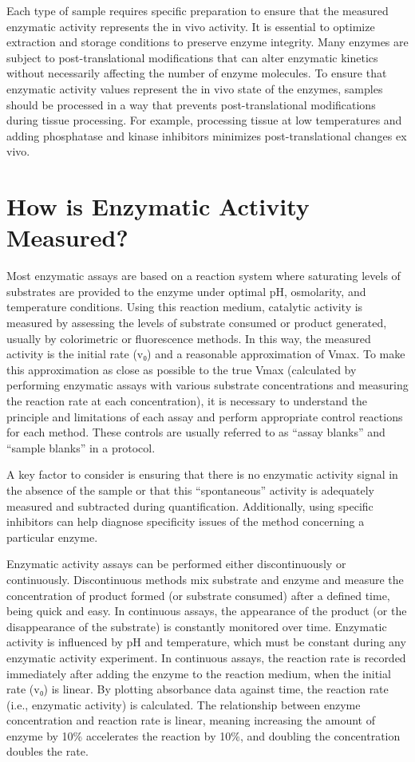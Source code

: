 \documentclass[
  9pt,
  american,
  a5paper,
  extrafontsizes,onecolumn,openright
  ]{memoir}
\newlength{\rf}
\begin{document}
Each type of sample requires specific preparation to ensure that the measured enzymatic activity represents the in vivo activity. It is essential to optimize extraction and storage conditions to preserve enzyme integrity. Many enzymes are subject to post-translational modifications that can alter enzymatic kinetics without necessarily affecting the number of enzyme molecules. To ensure that enzymatic activity values represent the in vivo state of the enzymes, samples should be processed in a way that prevents post-translational modifications during tissue processing. For example, processing tissue at low temperatures and adding phosphatase and kinase inhibitors minimizes post-translational changes ex vivo.

\section{How is Enzymatic Activity Measured?}\label{how-is-enzymatic-activity-measured}

Most enzymatic assays are based on a reaction system where saturating levels of substrates are provided to the enzyme under optimal pH, osmolarity, and temperature conditions. Using this reaction medium, catalytic activity is measured by assessing the levels of substrate consumed or product generated, usually by colorimetric or fluorescence methods. In this way, the measured activity is the initial rate (v₀) and a reasonable approximation of Vmax. To make this approximation as close as possible to the true Vmax (calculated by performing enzymatic assays with various substrate concentrations and measuring the reaction rate at each concentration), it is necessary to understand the principle and limitations of each assay and perform appropriate control reactions for each method. These controls are usually referred to as \enquote{assay blanks} and \enquote{sample blanks} in a protocol.

A key factor to consider is ensuring that there is no enzymatic activity signal in the absence of the sample or that this \enquote{spontaneous} activity is adequately measured and subtracted during quantification. Additionally, using specific inhibitors can help diagnose specificity issues of the method concerning a particular enzyme.

Enzymatic activity assays can be performed either discontinuously or continuously. Discontinuous methods mix substrate and enzyme and measure the concentration of product formed (or substrate consumed) after a defined time, being quick and easy. In continuous assays, the appearance of the product (or the disappearance of the substrate) is constantly monitored over time. Enzymatic activity is influenced by pH and temperature, which must be constant during any enzymatic activity experiment. In continuous assays, the reaction rate is recorded immediately after adding the enzyme to the reaction medium, when the initial rate (v₀) is linear. By plotting absorbance data against time, the reaction rate (i.e., enzymatic activity) is calculated. The relationship between enzyme concentration and reaction rate is linear, meaning increasing the amount of enzyme by 10\% accelerates the reaction by 10\%, and doubling the concentration doubles the rate.
\end{document}
